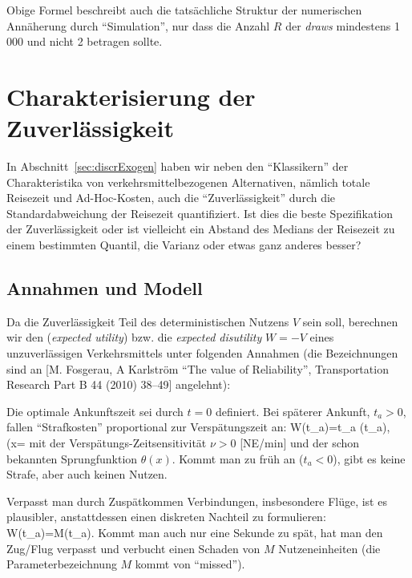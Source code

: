 Obige Formel beschreibt auch die tats\"achliche Struktur der numerischen Ann\"aherung
durch ``Simulation'', nur dass die Anzahl $R$ der \emph{draws}
mindestens 1\,000 und nicht 2 betragen sollte.

\section{\label{sec:zuverl} Charakterisierung der Zuverl\"assigkeit}
\EinsteinBeg

In Abschnitt~\ref{sec:discrExogen} haben wir neben den ``Klassikern''
der Charakteristika von ver\-kehrs\-mit\-tel\-bezogenen Alternativen,
n\"amlich totale Reisezeit und Ad-Hoc-Kosten, auch die
``Zuverl\"assigkeit'' durch die Standardabweichung der Reisezeit
quantifiziert. Ist dies die beste Spezifikation der Zuverl\"assigkeit
oder ist vielleicht ein Abstand des
Medians der Reisezeit zu
einem bestimmten Quantil, die Varianz oder etwas ganz anderes besser?

\subsection{Annahmen und Modell}
%
Da die Zuverl\"assigkeit Teil des deterministischen Nutzens $V$ sein
soll, berechnen wir den  (\emph{expected
  utility}) bzw. die \emph{expected
  disutility} $W=-V$ eines unzuverl\"assigen Verkehrsmittels unter folgenden
Annahmen (die Bezeichnungen sind an [M. Fosgerau, A Karlstr\"om ``The value of
Reliability'', Transportation Research Part B 44 (2010) 38–49] angelehnt):

\bi
\item Die optimale Ankunftszeit sei durch $t=0$ definiert. Bei
  sp\"aterer Ankunft, $t_a>0$, fallen ``Strafkosten'' proportional zur
  Versp\"atungszeit an: 
\be
\label{zuverl-Wdelay}
W(t_a)=\nu t_a \theta(t_a), \quad
\theta(x=
\ee
 mit der
  Versp\"atungs-Zeitsensitivit\"at $\nu>0$ [NE/min] und der schon
  bekannten Sprungfunktion $\theta(x)$.
Kommt man zu fr\"uh an ($t_a<0$), gibt es keine Strafe, aber auch
keinen Nutzen.

\item
Verpasst man durch Zusp\"atkommen Verbindungen, insbesondere Fl\"uge,
ist es plausibler, anstattdessen einen diskreten Nachteil zu
formulieren:
\be
\label{zuverl-Wmiss}
W(t_a)=M\theta(t_a).
\ee
Kommt man
auch nur eine Sekunde zu sp\"at, hat man den Zug/Flug verpasst und
verbucht einen Schaden von $M$ 
Nutzeneinheiten (die Parameterbezeichnung
$M$ kommt von ``mis\-sed'').

